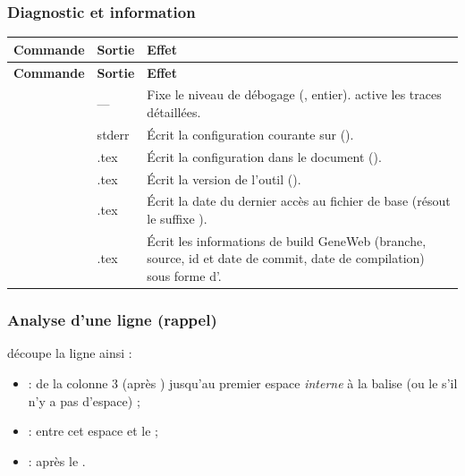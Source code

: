 \subsubsection*{Diagnostic et information}

\begin{longtable}{C T F}
\toprule
\textbf{Commande} & \textbf{Sortie} & \textbf{Effet} \\
\midrule
\endfirsthead
\toprule
\textbf{Commande} & \textbf{Sortie} & \textbf{Effet} \\
\midrule
\endhead
\bottomrule
\endfoot

 & — & Fixe le niveau de débogage (, entier). 
active les traces détaillées. \\
\addlinespace

  & stderr & Écrit la configuration courante sur 
(). \\
\addlinespace

 & .tex & Écrit la configuration dans le document
(). \\
\addlinespace

 & .tex & Écrit la version de l'outil (). \\
\addlinespace

 & .tex & Écrit la date du dernier accès au fichier de base
 (résout le suffixe ). \\
\addlinespace

 & .tex & Écrit les informations de build GeneWeb (branche,
source, id et date de commit, date de compilation) sous forme d'. \\
\end{longtable}

\subsubsection*{Analyse d'une ligne  (rappel)}

 découpe la ligne ainsi :

\begin{itemize}
  \item {} : de la colonne 3 (après ) jusqu'au premier espace
        \emph{interne} à la balise (ou le \cmd{>} s'il n'y a pas d'espace) ;
  \item {} : entre cet espace et le \cmd{>} ;
  \item {} : après le \cmd{>}.
\end{itemize}

